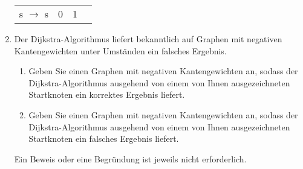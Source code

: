 \documentclass{lehramt-informatik-aufgabe}
\begin{document}
\begin{enumerate}
\begin{liAntwort}
\begin{tabular}{llll}
s  $\rightarrow$  s                                               & 0                                                                 & 1                                                                 &                                                                   \\
\end{tabular}
\end{liAntwort}


\item Der Dijkstra-Algorithmus liefert bekanntlich auf Graphen mit
negativen Kantengewichten unter Umständen ein falsches Ergebnis.

\begin{enumerate}


\item Geben Sie einen Graphen mit negativen Kantengewichten an, sodass
der Dijkstra-Algorithmus ausgehend von einem von Ihnen ausgezeichneten
Startknoten ein korrektes Ergebnis liefert.


\item Geben Sie einen Graphen mit negativen Kantengewichten an, sodass
der Dijkstra-Algorithmus ausgehend von einem von Ihnen ausgezeichneten
Startknoten ein falsches Ergebnis liefert.
\end{enumerate}

Ein Beweis oder eine Begründung ist jeweils nicht erforderlich.

\end{enumerate}
\end{document}
